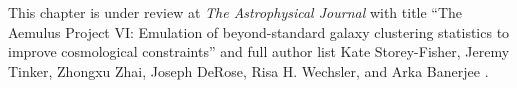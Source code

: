 This chapter is under review at \emph{The Astrophysical Journal} with title ``The Aemulus Project VI: Emulation of beyond-standard galaxy clustering statistics to improve cosmological constraints'' and full author list Kate Storey-Fisher, Jeremy Tinker, Zhongxu Zhai, Joseph DeRose, Risa H. Wechsler, and Arka Banerjee \citep{storey-fisher_aemulus_2022}.


\graphicspath{{figures/figures_aemulus/}}

     \renewcommand{\topfraction}{0.9}	%
     \renewcommand{\bottomfraction}{0.7}	%
     \setcounter{topnumber}{2}
     \setcounter{bottomnumber}{2}
     \setcounter{totalnumber}{2}     %
     \setcounter{dbltopnumber}{2}    %
     \renewcommand{\dbltopfraction}{0.9}	%
    \renewcommand{\textfraction}{0.1}	%
     \renewcommand{\floatpagefraction}{0.9}	%
     \renewcommand{\dblfloatpagefraction}{0.9}	%


